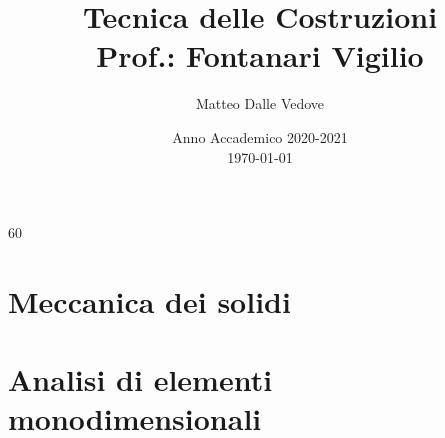 60\documentclass[10pt,a4paper,openright]{report}
\title{Tecnica delle Costruzioni \\ Prof.: Fontanari Vigilio}
\author{Matteo Dalle Vedove}
\date{Anno Accademico 2020-2021 \\ \today}
\begin{document}
	
	\maketitle
	\tableofcontents
	
	\part{Meccanica dei solidi}
	
	
	
	
	
	
	
	\part{Analisi di elementi monodimensionali}
	
	
\end{document}
